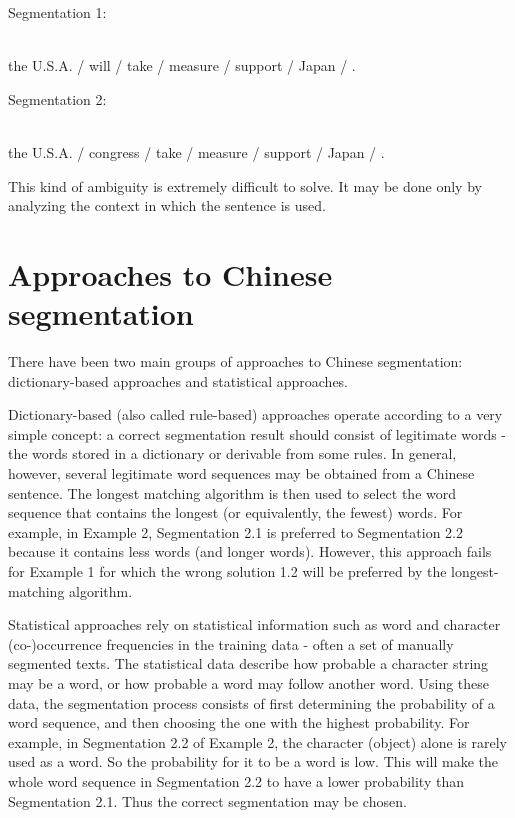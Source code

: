 \noindent Segmentation 1: 
\begin{minipage}[t]{4in}
 \\
the U.S.A. / will / take / measure / support / Japan / . 
\end{minipage}
\medskip


\noindent Segmentation 2: 
\begin{minipage}[t]{4in}
 \\
the U.S.A. / congress / take / measure / support / Japan / .
\end{minipage}
\medskip

This kind of ambiguity is extremely difficult to solve. It may be done only by analyzing the context in which the 
sentence is used.

\section{Approaches to Chinese segmentation}

There have been two main groups of approaches to Chinese segmentation: dictionary-based approaches and statistical 
approaches.

Dictionary-based (also called rule-based) approaches \cite{Chen92,Jin93,Li91,Liang84,Yeh91}
operate according to a very simple concept: a correct 
segmentation result should consist of legitimate words - the words stored in a dictionary or derivable from some rules. 
In general, however, several legitimate word sequences may be obtained from a Chinese sentence. The longest 
matching algorithm is then used to select the word sequence that contains the $\!$longest $\!$(or $\!$equivalently, $\!$the $\!$fewest)$\!$
words. For example, in Example 2, Segmentation 2.1 is preferred to Segmentation 2.2 because it contains less words 
(and longer words). However, this approach fails for Example 1 for which the wrong solution 1.2 will be preferred by 
the longest-matching algorithm.

Statistical approaches \cite{Chang91,Chiang92,Dunning93,Sproat91,Sproat96}
rely on statistical information such as word and character (co-)occurrence 
frequencies in the training data - often a set of manually segmented texts. The statistical data describe how probable a 
character string may be a word, or how probable a word may follow another word. Using these data, the segmentation 
process consists of first determining the probability of a word sequence, and then choosing the one with the highest 
probability. For example, in Segmentation 2.2 of Example 2, the character  (object) alone is rarely used as a word. 
So the probability for it to be a word is low. This will make the whole word sequence in Segmentation 2.2 to have a 
lower probability than Segmentation 2.1. Thus the correct segmentation may be chosen.

